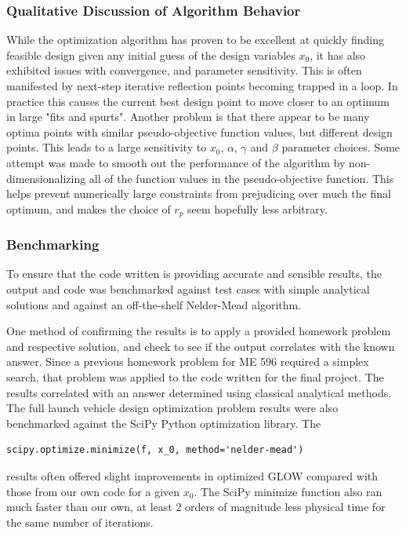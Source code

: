 \documentclass[]{aiaa-tc}%
\begin{document}
\subsubsection{Qualitative Discussion of Algorithm Behavior}
While the optimization algorithm has proven to be excellent at quickly finding feasible design given any initial guess of the design variables $x_0$, it has also exhibited issues with convergence, and parameter sensitivity. This is often manifested by next-step iterative reflection points becoming trapped in a loop. In practice this causes the current best design point to move closer to an optimum in large "fits and spurts". Another problem is that there appear to be many optima points with similar pseudo-objective function values, but different design points. This leads to a large sensitivity to $x_0$, $\alpha$, $\gamma$ and $\beta$ parameter choices. Some attempt was made to  smooth out the performance of the algorithm by non-dimensionalizing all of the function values in the pseudo-objective function. This helps prevent numerically large constraints from prejudicing over much the final optimum, and makes the choice of $r_p$ seem hopefully less arbitrary. 

\subsubsection{Benchmarking}
To ensure that the code written is providing accurate and sensible results, the output and code was benchmarked against test cases with simple analytical solutions and against an off-the-shelf Nelder-Mead algorithm. 

One method of confirming the results is to apply a provided homework problem and respective solution, and check to see if the output correlates with the known answer. Since a previous homework problem for ME 596 required a simplex search, that problem was applied to the code written for the final project. The results correlated with an answer determined using classical analytical methods. The full launch vehicle design optimization problem results were also benchmarked against the SciPy \cite{scipy} Python optimization library. The \begin{verbatim}scipy.optimize.minimize(f, x_0, method='nelder-mead') \end{verbatim} results often offered slight improvements in optimized GLOW compared with those from our own code for a given $x_0$. The SciPy minimize function also ran much faster than our own, at least 2 orders of magnitude less physical time for the same number of iterations.
\end{document}
